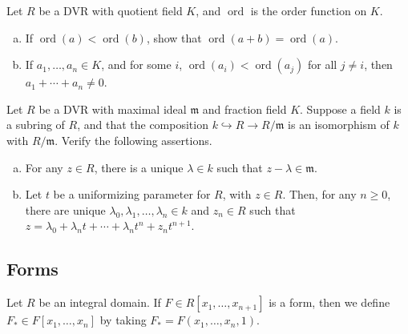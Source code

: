 \documentclass[10pt]{mypackage}
\begin{document}
\begin{exercise}[Exercise 2.29]
Let $R$ be a DVR with quotient field $K$, and $\operatorname{ord}$ is the order function on $K$.
\begin{enumerate}[(a)]
  \item If $\operatorname{ord}\left( a \right) < \operatorname{ord}\left( b \right)$, show that $\operatorname{ord}\left( a + b \right) = \operatorname{ord}\left( a \right)$.
  \item If $a_1,\dots,a_n\in K$, and for some $i$, $\operatorname{ord}\left( a_i \right) < \operatorname{ord}\left( a_j \right)$ for all $j\neq i$, then $a_1 + \cdots + a_n\neq 0$.
\end{enumerate}
\end{exercise}

\begin{exercise}[Exercise 2.30]
Let $R$ be a DVR with maximal ideal $\mathfrak{m}$ and fraction field $K$. Suppose a field $k$ is a subring of $R$, and that the composition $k\hookrightarrow R \rightarrow R/\mathfrak{m}$ is an isomorphism of $k$ with $R/\mathfrak{m}$. Verify the following assertions.
\begin{enumerate}[(a)]
  \item For any $z\in R$, there is a unique $\lambda\in k$ such that $z-\lambda\in \mathfrak{m}$.
  \item Let $t$ be a uniformizing parameter for $R$, with $z\in R$. Then, for any $n\geq 0$, there are unique $\lambda_0,\lambda_1,\dots,\lambda_n\in k$ and $z_n\in R$ such that $z = \lambda_0 + \lambda_n t + \cdots + \lambda_nt^{n} + z_nt^{n+1}$.
\end{enumerate}
\end{exercise}

\subsection{Forms}%
Let $R$ be an integral domain. If $F\in R\left[ x_1,\dots,x_{n+1} \right]$ is a form, then we define $F_{\ast}\in F\left[ x_1,\dots,x_n \right]$ by taking $F_{\ast} = F\left( x_1,\dots,x_n,1 \right)$.\newline
\end{document}
